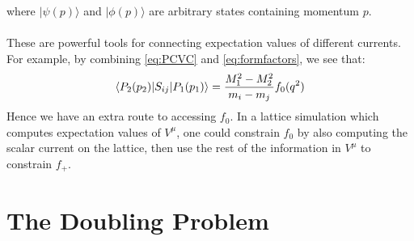 \documentclass[a4paper,10pt]{article}
\numberwithin{equation}{section}
\begin{document}
where $| \psi(p) \rangle$ and $| \phi(p) \rangle$ are arbitrary states containing momentum $p$.
\\ \\
These are powerful tools for connecting expectation values of different currents. For example, by combining \eqref{eq:PCVC} and \eqref{eq:formfactors}, we see that:
\begin{align}
	\langle P_2(p_2) | S_{ij} | P_1(p_1) \rangle = {M_1^2 - M_2^2 \over m_i - m_j} f_0(q^2)
\end{align}
Hence we have an extra route to accessing $f_0$. In a lattice simulation which computes expectation values of $V^{\mu}$, one could constrain $f_0$ by also computing the scalar current on the lattice, then use the rest of the information in $V^{\mu}$ to constrain $f_+$.

\section{The Doubling Problem}
\label{sec:doublingprob}
\end{document}
